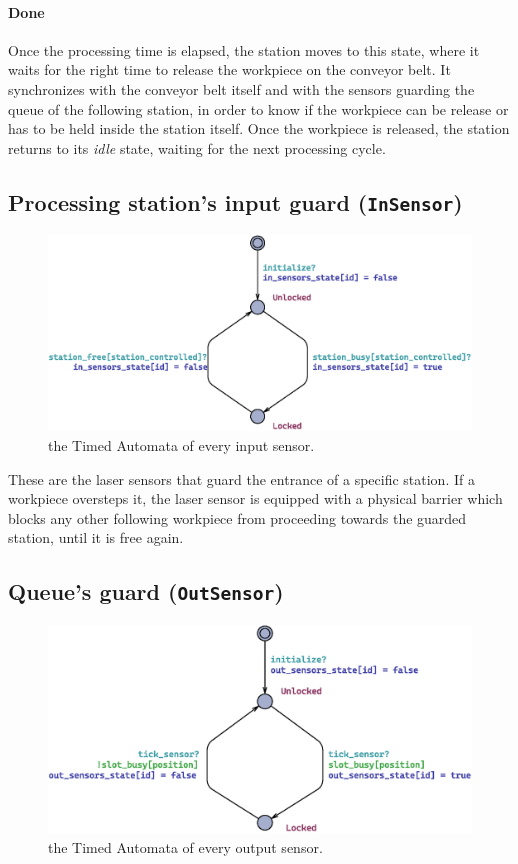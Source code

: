 \documentclass[a4paper]{article}
\begin{document}
    \paragraph{Done} Once the processing time is elapsed, the station moves to this state, where it waits for the right time to release the workpiece on the conveyor belt. It synchronizes with the conveyor belt itself and with the sensors guarding the queue of the following station, in order to know if the workpiece can be release or has to be held inside the station itself. Once the workpiece is released, the station returns to its \textit{idle} state, waiting for the next processing cycle.

    \subsection{Processing station's input guard (\texttt{InSensor})}

    \begin{figure}[h!]
        \centering
        \includegraphics[width=0.5\columnwidth]{./images/automata/in_sensor}
        \caption{the Timed Automata of every input sensor.}
    \end{figure}

    These are the laser sensors that guard the entrance of a specific station. If a workpiece oversteps it, the laser sensor is equipped with a physical barrier which blocks any other following workpiece from proceeding towards the guarded station, until it is free again.

    \subsection{Queue's guard (\texttt{OutSensor})}

    \begin{figure}[h!]
        \centering
        \includegraphics[width=0.45\columnwidth]{./images/automata/out_sensor}
        \caption{the Timed Automata of every output sensor.}
    \end{figure}
\end{document}
